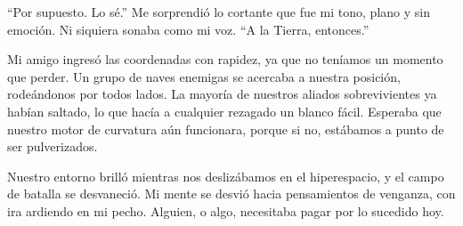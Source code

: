 “Por supuesto. Lo sé.” Me sorprendió lo cortante que fue mi tono, plano y sin emoción. Ni siquiera sonaba como mi voz. “A la Tierra, entonces.”

Mi amigo ingresó las coordenadas con rapidez, ya que no teníamos un momento que perder. Un grupo de naves enemigas se acercaba a nuestra posición, rodeándonos por todos lados. La mayoría de nuestros aliados sobrevivientes ya habían saltado, lo que hacía a cualquier rezagado un blanco fácil. Esperaba que nuestro motor de curvatura aún funcionara, porque si no, estábamos a punto de ser pulverizados.

Nuestro entorno brilló mientras nos deslizábamos en el hiperespacio, y el campo de batalla se desvaneció. Mi mente se desvió hacia pensamientos de venganza, con ira ardiendo en mi pecho. Alguien, o algo, necesitaba pagar por lo sucedido hoy.